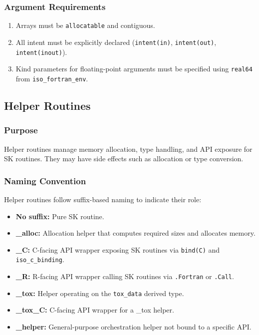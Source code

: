 \documentclass{article}
\begin{document}
\subsubsection{Argument Requirements}
\begin{enumerate}
  \item Arrays must be \texttt{allocatable} and contiguous.
  \item All intent must be explicitly declared (\texttt{intent(in)}, \texttt{intent(out)}, \texttt{intent(inout)}).
  \item Kind parameters for floating-point arguments must be specified using \texttt{real64} from \texttt{iso\_fortran\_env}.
\end{enumerate}

\subsection{Helper Routines}

\subsubsection{Purpose}
Helper routines manage memory allocation, type handling, and API exposure for SK routines. They may have side effects such as allocation or type conversion.

\subsubsection{Naming Convention}
Helper routines follow suffix-based naming to indicate their role:
\begin{itemize}
  \item \textbf{No suffix:} Pure SK routine.
  \item \textbf{\_alloc:} Allocation helper that computes required sizes and allocates memory.
  \item \textbf{\_C:} C-facing API wrapper exposing SK routines via \texttt{bind(C)} and \texttt{iso\_c\_binding}.
  \item \textbf{\_R:} R-facing API wrapper calling SK routines via \texttt{.Fortran} or \texttt{.Call}.
  \item \textbf{\_tox:} Helper operating on the \texttt{tox\_data} derived type.
  \item \textbf{\_tox\_C:} C-facing API wrapper for a \_tox helper.
  \item \textbf{\_helper:} General-purpose orchestration helper not bound to a specific API.
\end{itemize}
\end{document}
